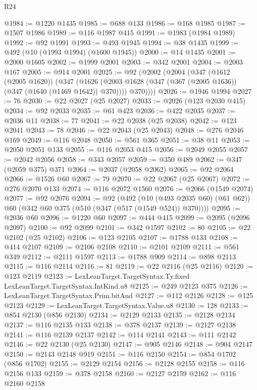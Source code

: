 \begin{lexlean}{R24}
\begin{coremodule}
@1984 := @1220 @1435
@1985 := @688 @133
@1986 := @168 @1985
@1987 := @1507 @1986
@1989 := @116 @1987 @415
@1991 := @1983 (@1984 @1989)
@1992 := @92 @1991
@1993 := @493 @1945
@1994 := @38 @1435
@1999 := @492 (@10 (@1993 @1994) (@1600 @1945))
@2000 := @14 @1435
@2001 := @2000 @1605
@2002 := @1999 @2001
@2003 := @342 @2001
@2004 := @2003 @167
@2005 := @914 @2001
@2025 := @92
    (@2002
      (@2004
        (@347
          (@1612 (@2005 @1620))
          (@347
            (@1626 (@2003 @1628 (@347 (@367 (@2005 @1636)) (@347 (@1640 (@1469 @1642)) @370))))
            @370))))
@2026 := @1946 @1994
@2027 := 76
@2030 := @22 @2027 (@25 @2027)
@2033 := @2026 (@123 @2030 @415)
@2034 := @92 @2033
@2035 := @61 @423
@2036 := @422 @2035
@2037 := @2036 @11
@2038 := 77
@2041 := @22 @2038 (@25 @2038)
@2042 := @123 @2041
@2043 := 78
@2046 := @22 @2043 (@25 @2043)
@2048 := @276 @2046 @169
@2049 := @116 @2048
@2050 := @561 @365
@2051 := @38 @11
@2053 := @2050 @2051 @133
@2055 := @116 @2053 @415
@2056 := @2049 @2055
@2057 := @2042 @2056
@2058 := @343 @2057
@2059 := @350 @489
@2062 := @347 (@2059 @375) @371
@2064 := @2037 (@2058 @2062)
@2065 := @92 @2064
@2066 := @1526 @60
@2067 := 79
@2070 := @22 @2067 (@25 @2067)
@2072 := @276 @2070 @133
@2074 := @116 @2072 @1560
@2076 := @2066 (@1549 @2074)
@2077 := @92 @2076
@2094 := @92
    (@492
      (@10 (@493 @2035 @60) (@61 @62))
      @60
      (@342 @60 @375 (@510 (@347 (@517 (@1549 @524)) @370))))
@2095 := @2036 @60
@2096 := @1220 @60
@2097 := @444 @415
@2099 := @2095 (@2096 @2097)
@2100 := @92 @2099
@2101 := @342 @1597
@2102 := 80
@2105 := @22 @2102 (@25 @2102)
@2106 := @123 @2105
@2107 := @1788 @133
@2108 := @414 @2107
@2109 := @2106 @2108
@2110 := @2101 @2109
@2111 := @561 @349
@2112 := @2111 @1597
@2113 := @1788 @909
@2114 := @898 @2113
@2115 := @116 @2114
@2116 := 81
@2119 := @22 @2116 (@25 @2116)
@2120 := @123 @2119
@2123 := LexLeanTarget.TargetSyntax.Ty.fixed LexLeanTarget.TargetSyntax.IntKind.u8
@2125 := @249 @2123 @375
@2126 := LexLeanTarget.TargetSyntax.Prim.bitAnd
@2127 := @112 @2126
@2128 := @125 @2123
@2129 := LexLeanTarget.TargetSyntax.Value.u8
@2130 := 128
@2133 := @854 @2130 (@856 @2130)
@2134 := @2129 @2133
@2135 := @2128 @2134
@2137 := @116 @2135 @133
@2138 := @378 @2137
@2139 := @2127 @2138
@2141 := @116 @2139 @2137
@2142 := @114 @2141
@2143 := @111 @2142
@2146 := @22 @2130 (@25 @2130)
@2147 := @905 @2146
@2148 := @904 @2147
@2150 := @2143 @2148 @919
@2151 := @116 @2150
@2154 := @854 @1702 (@856 @1702)
@2155 := @2129 @2154
@2156 := @2128 @2155
@2158 := @116 @2156 @133
@2159 := @378 @2158
@2160 := @2127 @2159
@2162 := @116 @2160 @2158

\end{coremodule}
\end{lexlean}
